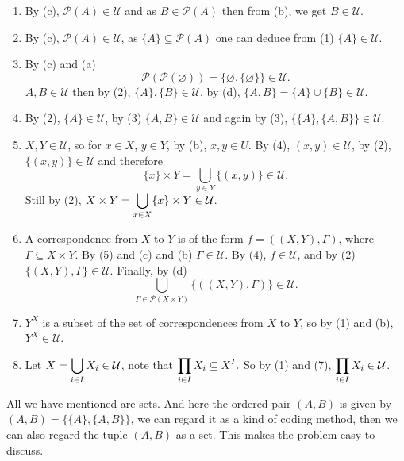 \begin{proofenv}
\quad
\begin{enumerate}[label=(\arabic*)]
    \item By (c), $\mathscr{P}(A)\in \mathcal{U}$ and as $B\in \mathscr{P}(A)$ then from (b), we get $B\in \mathcal{U}$.
    \item By (c), $\mathscr{P}(A)\in \mathcal{U}$, as $\{A\}\subseteq \mathscr{P}(A)$ one can deduce from (1) $\{A\}\in \mathcal{U}$.
    \item By (c) and (a) $$\mathscr{P}(\mathscr{P}(\varnothing))=\{\varnothing,\{\varnothing\}\}\in \mathcal{U}.$$ $A,B\in \mathcal{U}$ then by (2), $\{A\},\{B\}\in \mathcal{U}$, by (d), $\{A,B\}=\{A\}\cup\{B\}\in \mathcal{U}.$
    \item By (2), $\{A\}\in \mathcal{U}$, by (3) $\{A,B\}\in \mathcal{U}$ and again by (3), $\{\{A\},\{A,B\}\}\in \mathcal{U}$.
    \item $X,Y\in\mathcal{U}$, so for $x\in X$, $y\in Y$, by (b), $x,y\in U$. By (4), $(x,y)\in \mathcal{U}$, by (2), $\{(x,y)\}\in \mathcal{U}$ and therefore $$\{x\}\times Y = \bigcup_{y\in Y} \{(x,y)\}\in \mathcal{U}.$$ Still by (2), $\displaystyle X\times Y = \bigcup_{x\in X}\{x\}\times Y\in \mathcal{U}$.
    \item A correspondence from $X$ to $Y$ is of the form $f = ((X,Y), \Gamma)$, where $\Gamma \subseteq X\times Y$. By (5) and (c) and (b) $\Gamma \in \mathcal{U}$. By (4), $f \in \mathcal{U}$, and by (2) $\{(X,Y),\Gamma\}\in \mathcal{U}.$ Finally, by (d) $$\bigcup_{\Gamma \in \mathscr{P}(X\times Y)}\{((X,Y),\Gamma)\} \in \mathcal{U}.$$
    \item $Y^X$ is a subset of the set of correspondences from $X$ to $Y$, so by (1) and (b), $Y^X\in \mathcal{U}$.
    \item Let $\displaystyle X=\bigcup_{i\in I}X_i \in \mathcal{U}$, note that $\displaystyle \prod_{i\in I}X_i \subseteq X^I.$ So by (1) and (7), $\displaystyle \prod_{i\in I}X_i \in \mathcal{U}$.
\end{enumerate}
\end{proofenv}
\begin{remark}
    All we have mentioned are sets. And here the ordered pair $(A,B)$ is given by $(A,B)=\{\{A\},\{A,B\}\}$, we can regard it as a kind of coding method, then we can also regard the tuple $(A,B)$ as a set. This makes the problem easy to discuss.
\end{remark}
